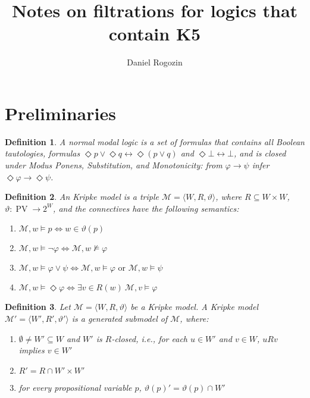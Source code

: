 \documentclass[a4paper]{article}
\author{Daniel Rogozin}
\date{}
\title{Notes on filtrations for logics that contain {\bf K5}}
\theoremstyle{defin}
\newtheorem{defin}{Definition}
\theoremstyle{theorem}
\theoremstyle{prop}
\theoremstyle{lemma}
\theoremstyle{fact}
\theoremstyle{ex}
\theoremstyle{col}
\begin{document}
\maketitle

\section{Preliminaries}

\begin{defin}
  A normal modal logic is a set of formulas that contains all Boolean tautologies,
  formulas $\Diamond p \lor \Diamond q \leftrightarrow \Diamond (p \lor q)$ and
  $\Diamond \bot \leftrightarrow \bot$, and is closed under Modus Ponens, Substitution, and
  Monotonicity:
  from $\varphi \rightarrow \psi$ infer $\Diamond \varphi \rightarrow \Diamond \psi$.
\end{defin}

\begin{defin} An Kripke model is a triple $\mathcal{M} = \langle W, R, \vartheta \rangle$,
  where $R \subseteq W \times W$, $\vartheta : \operatorname{PV} \to 2^W$, and
  the connectives have the following semantics:

  \begin{enumerate}
    \item $\mathcal{M}, w \models p \Leftrightarrow w \in \vartheta(p)$
    \item $\mathcal{M}, w \models \neg \varphi \Leftrightarrow \mathcal{M}, w \nvDash \varphi$
    \item $\mathcal{M}, w \models \varphi \lor \psi \Leftrightarrow \mathcal{M}, w \models \varphi \text{ or } \mathcal{M}, w \models \psi$
    \item $\mathcal{M}, w \models \Diamond \varphi \Leftrightarrow \exists v \in R(w) \: \mathcal{M}, v \models \varphi$
  \end{enumerate}
\end{defin}

\begin{defin}
  Let $\mathcal{M} = \langle W, R, \vartheta \rangle$ be a Kripke model.
  A Kripke model $\mathcal{M}' = \langle W', R', \vartheta' \rangle$ is a generated submodel of
  $\mathcal{M}$, where:
  \begin{enumerate}
    \item $\emptyset \neq W' \subseteq W$ and $W'$ is $R$-closed, i.e., for each $u \in W'$ and $v \in W$,
    $u R v$ implies $v \in W'$
    \item $R' = R \cap W' \times W'$
    \item for every propositional variable $p$, $\vartheta(p)' = \vartheta(p) \cap W'$
  \end{enumerate}
\end{defin}
\end{document}
